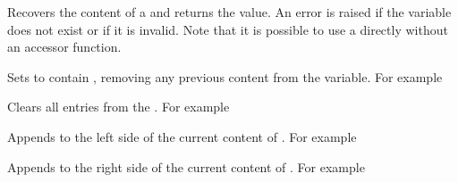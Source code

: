 \documentclass[oneside]{book}
\begin{document}
\begin{function}{\TlUse}
\begin{syntax}
 
\end{syntax}
Recovers the content of a  and returns the value.
An error is raised if the variable
does not exist or if it is invalid. Note that it is possible to use
a  directly without an accessor function.
\end{function}

\begin{function}{\TlSet}
\begin{syntax}
  
\end{syntax}
Sets  to contain ,
removing any previous content from the variable. For example
\begin{demohigh}
\TlSet{}
\TlUse\lTmpiTl
\end{demohigh}
\end{function}

\begin{function}{\TlClear}
\begin{syntax}
 
\end{syntax}
Clears all entries from the . For example
\begin{demohigh}
\TlSet{}
\TlClear\lTmpjTl
\TlSet{}
\TlUse\lTmpjTl
\end{demohigh}
\end{function}

\begin{function}{\TlPutLeft}
\begin{syntax}
  
\end{syntax}
Appends  to the left side of the current content of
. For example
\begin{demohigh}
\TlSet{}
\TlPutLeft{}
\TlUse\lTmpkTl
\end{demohigh}
\end{function}

\begin{function}{\TlPutRight}
\begin{syntax}
  
\end{syntax}
Appends  to the right side of the current content of
. For example
\begin{demohigh}
\TlSet{}
\TlPutRight{}
\TlUse\lTmpkTl
\end{demohigh}
\end{function}
\end{document}
